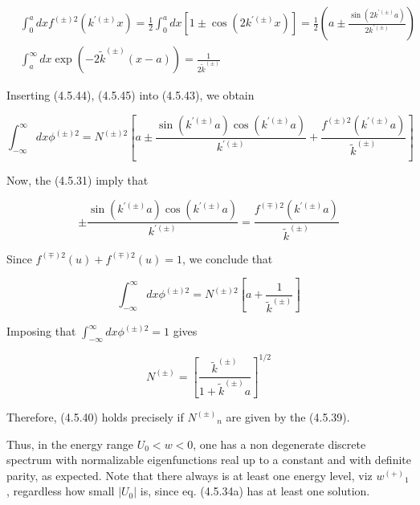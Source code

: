 \documentclass{article}
\begin{document}
\begin{align*}
& \int_{0}^{a} d x f^{( \pm) 2}\left(k^{\prime( \pm)} x\right)=\frac{1}{2} \int_{0}^{a} d x\left[1 \pm \cos \left(2 k^{\prime( \pm)} x\right)\right]=\frac{1}{2}\left(a \pm \frac{\sin \left(2 k^{\prime( \pm)} a\right)}{2 k^{\prime( \pm)}}\right)  \tag{4.5.44}\\
& \int_{a}^{\infty} d x \exp \left(-2 \tilde{k}^{( \pm)}(x-a)\right)=\frac{1}{2 \tilde{k}^{( \pm)}} \tag{4.5.45}
\end{align*}
 

Inserting (4.5.44), (4.5.45) into (4.5.43), we obtain
 
\begin{equation*}
\int_{-\infty}^{\infty} d x \phi^{( \pm) 2}=N^{( \pm) 2}\left[a \pm \frac{\sin \left(k^{\prime( \pm)} a\right) \cos \left(k^{\prime( \pm)} a\right)}{k^{\prime( \pm)}}+\frac{f^{( \pm) 2}\left(k^{\prime( \pm)} a\right)}{\tilde{k}^{( \pm)}}\right] \tag{4.5.46}
\end{equation*}
 

Now, the (4.5.31) imply that
 
\begin{equation*}
\pm \frac{\sin \left(k^{\prime( \pm)} a\right) \cos \left(k^{\prime( \pm)} a\right)}{k^{\prime( \pm)}}=\frac{f^{(\mp) 2}\left(k^{\prime( \pm)} a\right)}{\tilde{k}^{( \pm)}} \tag{4.5.47}
\end{equation*}
 

Since $f^{(\mp) 2}(u)+f^{(\mp) 2}(u)=1$, we conclude that
 
\begin{equation*}
\int_{-\infty}^{\infty} d x \phi^{( \pm) 2}=N^{( \pm) 2}\left[a+\frac{1}{\tilde{k}^{( \pm)}}\right] \tag{4.5.48}
\end{equation*}
 

Imposing that $\int_{-\infty}^{\infty} d x \phi^{( \pm) 2}=1$ gives
 
\begin{equation*}
N^{( \pm)}=\left[\frac{\tilde{k}^{( \pm)}}{1+\tilde{k}^{( \pm)} a}\right]^{1 / 2} \tag{4.5.49}
\end{equation*}
 

Therefore, (4.5.40) holds precisely if $N^{( \pm)}{ }_{n}$ are given by the (4.5.39).

Thus, in the energy range $U_{0}<w<0$, one has a non degenerate discrete spectrum with normalizable eigenfunctions real up to a constant and with definite parity, as expected. Note that there always is at least one energy level, viz $w^{(+)}{ }_{1}$, regardless how small $\left|U_{0}\right|$ is, since eq. (4.5.34a) has at least one solution.
\end{document}
